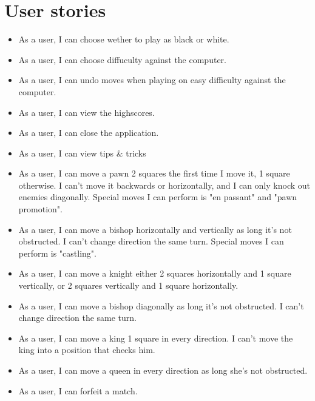 \documentclass[letterpaper,11pt]{article}
\begin{document}
\newpage
\section*{User stories}
\begin{itemize}
	\item As a user, I can choose wether to play as black or white.
	\item As a user, I can choose diffuculty against the computer.
	\item As a user, I can undo moves when playing on easy difficulty against the computer.
	\item As a user, I can view the highscores.
	\item As a user, I can close the application.
	\item As a user, I can view tips \& tricks
	\item As a user, I can move a pawn 2 squares the first time I move it, 1 square otherwise. I can't move it backwards or horizontally, and I can only knock out enemies diagonally. Special moves I can perform is "en passant" and "pawn promotion".
	\item As a user, I can move a bishop horizontally and vertically as long it's not obstructed. I can't change direction the same turn. Special moves I can perform is "castling".
	\item As a user, I can move a knight either 2 squares horizontally and 1 square vertically, or 2 squares vertically and 1 square horizontally.
	\item As a user, I can move a bishop diagonally as long it's not obstructed. I can't change direction the same turn.
	\item As a user, I can move a king 1 square in every direction. I can't move the king into a position that checks him.
	\item As a user, I can move a queen in every direction as long she's not obstructed.
	\item As a user, I can forfeit a match.
\end{itemize}

\newpage
\end{document}

